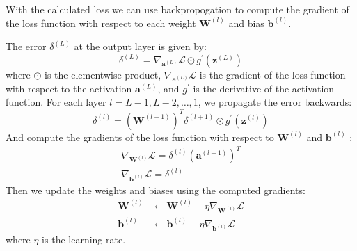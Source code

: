 With the calculated loss we can use backpropogation to compute the gradient of the loss function with respect to each weight $\mathbf{W}^{(l)}$ and bias $\mathbf{b}^{(l)}$. 

The error $\delta^{(L)}$ at the output layer is given by:
$$
\delta^{(L)}=\nabla_{\mathbf{a}^{(L)}} \mathcal{L} \odot g^{\prime}\left(\mathbf{z}^{(L)}\right)
$$
where $\odot$ is the elementwise product, $\nabla_{\mathbf{a}^{(L)}} \mathcal{L}$ is the gradient of the loss function with respect to the activation $\mathbf{a}^{(L)}$, and $g^{\prime}$ is the derivative of the activation function. For each layer $l=L-1, L-2, \ldots, 1$, we propagate the error backwards:
$$
    \delta^{(l)}=\left(\mathbf{W}^{(l+1)}\right)^T \delta^{(l+1)} \odot g^{\prime}\left(\mathbf{z}^{(l)}\right)
$$
And compute the gradients of the loss function with respect to $\mathbf{W}^{(l)}$ and $\mathbf{b}^{(l)}$ :
$$
\begin{gathered}
\nabla_{\mathbf{W}^{(l)}} \mathcal{L}=\delta^{(l)}\left(\mathbf{a}^{(l-1)}\right)^T \\
\nabla_{\mathbf{b}^{(l)}} \mathcal{L}=\delta^{(l)}
\end{gathered}
$$
Then we update the weights and biases using the computed gradients:
$$
\begin{aligned}
\mathbf{W}^{(l)} & \leftarrow \mathbf{W}^{(l)}-\eta \nabla_{\mathbf{W}^{(l)}} \mathcal{L} \\
\mathbf{b}^{(l)} & \leftarrow \mathbf{b}^{(l)}-\eta \nabla_{\mathbf{b}^{(l)}} \mathcal{L}
\end{aligned}
$$
where $\eta$ is the learning rate.
